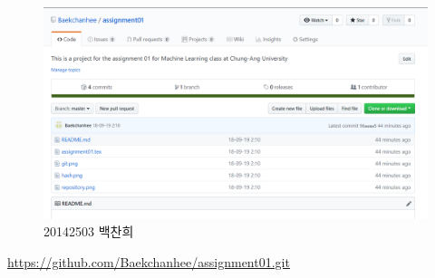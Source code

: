 \documentclass[letterpaper,12pt]{article}
\begin{document}
\begin{figure}[ht] 
        \centering \includegraphics[width=0.8\columnwidth]{github}
         \caption{
                \label{fig:github}  
                20142503 백찬희
        }
\end{figure}















\href{https://github.com/Baekchanhee/assignment01.git}{https://github.com/Baekchanhee/assignment01.git}
\end{document}
